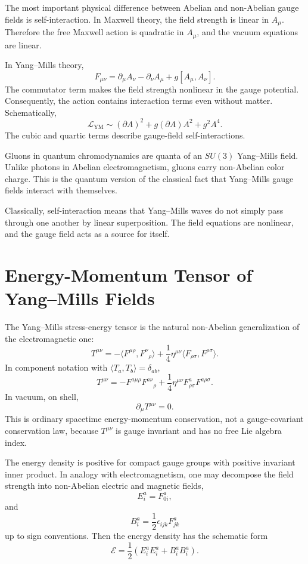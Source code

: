 The most important physical difference between Abelian and non-Abelian gauge
fields is self-interaction. In Maxwell theory, the field strength is linear in
\(A_\mu\). Therefore the free Maxwell action is quadratic in \(A_\mu\), and the
vacuum equations are linear.

In Yang--Mills theory,
\[
    F_{\mu\nu}=\partial_\mu A_\nu-\partial_\nu A_\mu+g[A_\mu,A_\nu].
\]
The commutator term makes the field strength nonlinear in the gauge potential.
Consequently, the action contains interaction terms even without matter.
Schematically,
\[
    \mathcal{L}_{\mathrm{YM}}
    \sim (\partial A)^2+g(\partial A)A^2+g^2A^4.
\]
The cubic and quartic terms describe gauge-field self-interactions.

\begin{examplebox}
Gluons in quantum chromodynamics are quanta of an \(SU(3)\) Yang--Mills field.
Unlike photons in Abelian electromagnetism, gluons carry non-Abelian color
charge. This is the quantum version of the classical fact that Yang--Mills gauge
fields interact with themselves.
\end{examplebox}

Classically, self-interaction means that Yang--Mills waves do not simply pass
through one another by linear superposition. The field equations are nonlinear,
and the gauge field acts as a source for itself.

\section{Energy-Momentum Tensor of Yang--Mills Fields}

The Yang--Mills stress-energy tensor is the natural non-Abelian generalization
of the electromagnetic one:
\[
    T^{\mu\nu}
    =-\langle F^{\mu\rho},F^\nu{}_{\rho}\rangle
     +\frac{1}{4}\eta^{\mu\nu}\langle F_{\rho\sigma},F^{\rho\sigma}\rangle.
\]
In component notation with \(\langle T_a,T_b\rangle=\delta_{ab}\),
\[
    T^{\mu\nu}
    =-F^{a\mu\rho}F^{a\nu}{}_{\rho}
     +\frac{1}{4}\eta^{\mu\nu}F_{\rho\sigma}^aF^{a\rho\sigma}.
\]
In vacuum, on shell,
\[
    \partial_\mu T^{\mu\nu}=0.
\]
This is ordinary spacetime energy-momentum conservation, not a gauge-covariant
conservation law, because \(T^{\mu\nu}\) is gauge invariant and has no free Lie
algebra index.

The energy density is positive for compact gauge groups with positive invariant
inner product. In analogy with electromagnetism, one may decompose the field
strength into non-Abelian electric and magnetic fields,
\[
    E_i^a=F_{0i}^a,
\]
and
\[
    B_i^a=\frac{1}{2}\epsilon_{ijk}F_{jk}^a
\]
up to sign conventions. Then the energy density has the schematic form
\[
    \mathcal{E}=\frac{1}{2}\left(E_i^aE_i^a+B_i^aB_i^a\right).
\]


